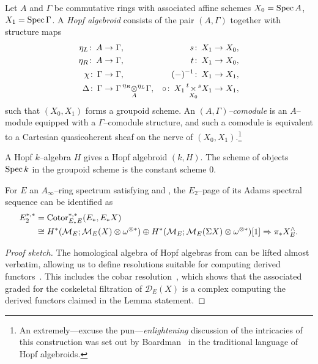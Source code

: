 \begin{definition}\label{FHGivesComodules}
Let \(A\) and \(\Gamma\) be commutative rings with associated affine schemes \(X_0 = \operatorname{Spec} A\), \(X_1 = \operatorname{Spec} \Gamma\).  A \textit{Hopf algebroid} consists of the pair \((A, \Gamma)\) together with structure maps
\begin{align*}
\eta_L \co A & \to \Gamma, & s\co X_1 & \to X_0, \\
\eta_R \co A & \to \Gamma, & t\co X_1 & \to X_0, \\
\chi \co \Gamma & \to \Gamma, & (-)^{-1}\co X_1 & \to X_1, \\
\Delta \co \Gamma & \to \Gamma \presuper{\eta_R}{\underset{A}\otimes}^{\eta_L} \Gamma, & \circ\co X_1 \presuper{t}{\underset{X_0}{\times}}^{s} X_1 & \to X_1,
\end{align*}
such that \((X_0, X_1)\) forms a groupoid scheme.  An \textit{\((A, \Gamma)\)--comodule} is an \(A\)--module equipped with a \(\Gamma\)--comodule structure, and such a comodule is equivalent to a Cartesian quasicoherent sheaf on the nerve of \((X_0, X_1)\).\footnote{An extremely---excuse the pun---\emph{enlightening} discussion of the intricacies of this construction was set out by Boardman~\cite{BoardmanEightfoldWay} in the traditional language of Hopf algebroids.}
\end{definition}

\begin{example}
A Hopf \(k\)--algebra \(H\) gives a Hopf algebroid \((k, H)\).  The scheme of objects \(\operatorname{Spec} k\) in the groupoid scheme is the constant scheme \(0\).
\end{example}

\begin{lemma}\label{IdentifyingAdamsE2Page}
For \(E\) an \(A_\infty\)--ring spectrum satisfying {\CH} and {\FH}, the \(E_2\)--page of its Adams spectral sequence can be identified as
\begin{align*}
E_2^{*, *} & = \operatorname{Cotor}_{E_* E}^{*, *}(E_*, E_* X) \\
& \cong H^*(\mathcal{M}_{E}; \mathcal{M}_{E}(X) \otimes \omega^{\otimes *}) \oplus H^*(\mathcal{M}_{E}; \mathcal{M}_{E}(\Sigma X) \otimes \omega^{\otimes *})[1] \Rightarrow \pi_* X^\wedge_E.
\end{align*}
\end{lemma}
\begin{proof}[Proof sketch]
The homological algebra of Hopf algebras from  can be lifted almost verbatim, allowing us to define resolutions suitable for computing derived functors~\cite[Definition A1.2.3]{RavenelGreenBook}.  This includes the cobar resolution~\cite[Definition A1.2.11]{RavenelGreenBook}, which shows that the associated graded for the coskeletal filtration of \(\mathcal D_E(X)\) is a complex computing the derived functors claimed in the Lemma statement.
\end{proof}

